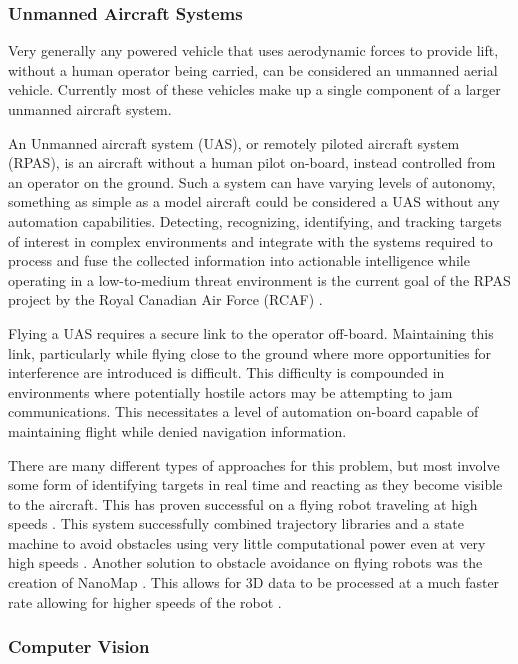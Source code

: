 \documentclass{article}
\begin{document}
		\subsubsection{Unmanned Aircraft Systems}
		
		Very generally any powered vehicle that uses aerodynamic forces to provide lift, without a human operator being carried, can be considered an unmanned aerial vehicle. Currently most of these vehicles make up a single component of a larger unmanned aircraft system. 
		
		An Unmanned aircraft system (UAS), or remotely piloted aircraft system (RPAS), is an aircraft without a human pilot on-board, instead controlled from an operator on the ground. Such a system can have varying levels of autonomy, something as simple as a model aircraft could be considered a UAS without any automation capabilities. Detecting, recognizing, identifying, and tracking targets of interest in complex environments and integrate with the systems required to process and fuse the collected information into actionable intelligence while operating in a low-to-medium threat environment is the current goal of the RPAS project by the Royal Canadian Air Force (RCAF) \cite{RPAS}. 
		
		Flying a UAS requires a secure link to the operator off-board. Maintaining this link, particularly while flying close to the ground where more opportunities for interference are introduced is difficult. This difficulty is compounded in environments where potentially hostile actors may be attempting to jam communications. This necessitates a level of automation on-board capable of maintaining flight while denied navigation information.
		
		There are many different types of approaches for this problem, but most involve some form of identifying targets in real time and reacting as they become visible to the aircraft. This has proven successful on a flying robot traveling at high speeds \cite{barry2015pushbroom}. This system successfully combined trajectory libraries and a state machine to avoid obstacles using very little computational power even at very high speeds \cite{barry2018high}. Another solution to obstacle avoidance on flying robots was the creation of NanoMap \cite{2018nanomap}. This allows for 3D data to be processed at a much faster rate allowing for higher speeds of the robot \cite{2018nanomap}.
		
		\subsubsection{Computer Vision}
		
\end{document}
